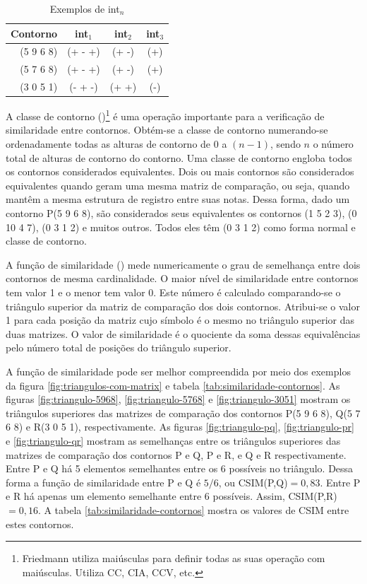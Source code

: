 \begin{table}
  \centering
  \begin{tabular}{r|ccc}
    Contorno & int$_1$ & int$_2$ & int$_3$ \\
    \hline
    (5 9 6 8) & (+ - +) & (+ -) & (+) \\
    (5 7 6 8) & (+ - +) & (+ -) & (+) \\
    (3 0 5 1) & (- + -) & (+ +) & (-)
  \end{tabular}
  \caption{Exemplos de int$_n$}
  \label{tab:int-contornos}
\end{table}


A classe de contorno ()\footnote{Friedmann utiliza maiúsculas
  para definir todas as suas operação com maiúsculas. Utiliza CC, CIA,
  CCV, etc.} é uma operação importante para a verificação de
similaridade entre contornos. Obtém-se a classe de contorno
numerando-se ordenadamente todas as alturas de contorno de $0$ a
$(n-1)$, sendo $n$ o número total de alturas de contorno do
contorno. Uma classe de contorno engloba todos os contornos
considerados equivalentes. Dois ou mais contornos são considerados
equivalentes quando geram uma mesma matriz de comparação, ou seja,
quando mantêm a mesma estrutura de registro entre suas notas. Dessa
forma, dado um contorno P(5 9 6 8), são considerados seus equivalentes
os contornos (1 5 2 3), (0 10 4 7), (0 3 1 2) e muitos outros. Todos
eles têm (0 3 1 2) como forma normal e classe de contorno.

A função de similaridade () mede numericamente o grau de
semelhança entre dois contornos de mesma cardinalidade. O maior nível
de similaridade entre contornos tem valor 1 e o menor tem valor
0. Este número é calculado comparando-se o triângulo superior da
matriz de comparação dos dois contornos. Atribui-se o valor 1 para
cada posição da matriz cujo símbolo é o mesmo no triângulo superior
das duas matrizes. O valor de similaridade é o quociente da soma
dessas equivalências pelo número total de posições do triângulo
superior.

A função de similaridade pode ser melhor compreendida por meio dos
exemplos da figura \ref{fig:triangulos-com-matrix} e tabela
\ref{tab:similaridade-contornos}. As figuras \ref{fig:triangulo-5968},
\ref{fig:triangulo-5768} e \ref{fig:triangulo-3051} mostram os
triângulos superiores das matrizes de comparação dos contornos P(5 9 6
8), Q(5 7 6 8) e R(3 0 5 1), respectivamente. As figuras
\ref{fig:triangulo-pq}, \ref{fig:triangulo-pr} e
\ref{fig:triangulo-qr} mostram as semelhanças entre os triângulos
superiores das matrizes de comparação dos contornos P e Q, P e R, e Q
e R respectivamente. Entre P e Q há 5 elementos semelhantes entre os 6
possíveis no triângulo. Dessa forma a função de similaridade entre P e
Q é $5/6$, ou CSIM(P,Q)$=0,83$. Entre P e R há apenas um elemento
semelhante entre 6 possíveis. Assim, CSIM(P,R)$=0,16$. A tabela
\ref{tab:similaridade-contornos} mostra os valores de CSIM entre estes
contornos.

